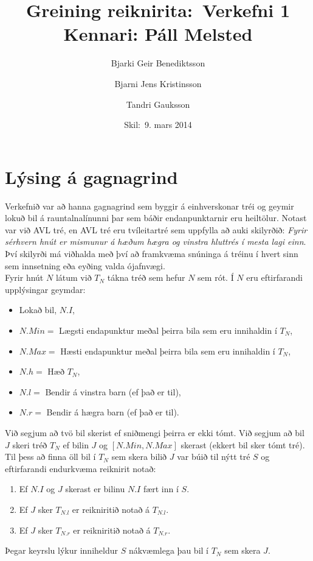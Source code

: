 \documentclass[a4paper,oneside]{article}
\title{
    Greining reiknirita:\ Verkefni 1
    \\\small{Kennari: Páll Melsted}
}
\author{Bjarki Geir Benediktsson \and  Bjarni Jens Kristinsson \and Tandri Gauksson}
\date{\small{Skil:\ 9. mars 2014}}
\begin{document}
\maketitle

\section{Lýsing á gagnagrind}

Verkefnið var að hanna gagnagrind sem byggir á einhverskonar tréi og geymir lokuð bil á rauntalnalínunni þar sem báðir endanpunktarnir eru heiltölur.
Notast var við AVL tré, en AVL tré eru tvíleitartré sem uppfylla að auki skilyrðið: \textit{Fyrir sérhvern hnút er mismunur á hæðum hægra og vinstra hluttrés í mesta lagi einn}.
Því skilyrði má viðhalda með því að framkvæma snúninga á tréinu í hvert sinn sem innsetning eða eyðing valda ójafnvægi.\\

\noindent
Fyrir hnút $N$ látum við $T_N$ tákna tréð sem hefur $N$ sem rót. Í $N$ eru eftirfarandi upplýsingar geymdar:
\begin{itemize}
    \item Lokað bil, $N.I$,
    \item $N.Min =$ Lægsti endapunktur meðal þeirra bila sem eru innihaldin í $T_N$,
    \item $N.Max =$ Hæsti endapunktur meðal þeirra bila sem eru innihaldin í $T_N$,
    \item $N.h = $ Hæð $T_N$,
    \item $N.l = $ Bendir á vinstra barn (ef það er til),
    \item $N.r = $ Bendir á hægra barn (ef það er til).
\end{itemize}

\noindent
Við segjum að tvö bil skerist ef sniðmengi þeirra er ekki tómt.
Við segjum að bil $J$ skeri tréð $T_N$ ef bilin $J$ og $[N.Min, N.Max]$ skerast (ekkert bil sker tómt tré).
Til þess að finna öll bil í $T_N$ sem skera bilið $J$ var búið til nýtt tré $S$ og eftirfarandi endurkvæma reiknirit notað:
\begin{enumerate}
    \item Ef $N.I$ og $J$ skerast er bilinu $N.I$ fært inn í $S$.
    \item Ef $J$ sker $T_{N.l}$ er reikniritið notað á $T_{N.l}$.
    \item Ef $J$ sker $T_{N.r}$ er reikniritið notað á $T_{N.r}$.
\end{enumerate}
Þegar keyrslu lýkur inniheldur $S$ nákvæmlega þau bil í $T_N$ sem skera $J$.\\
\end{document}
